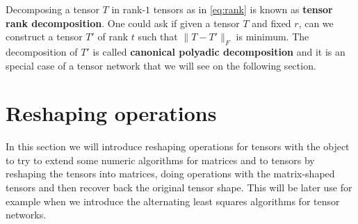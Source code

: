 \documentclass[11pt,a4paper,openright,oneside]{book}
\numberwithin{equation}{section}
\newtheorem{prop0}[defn0]{Proposition}
\newenvironment{proposition}{\bigskip \begin{prop0}}{\end{prop0}}
\newcommand{\refeq}[1]{\cref{#1}}
\DeclareMathOperator{\rank}{rank}
\begin{document}

Decomposing a tensor $T$ in rank-$1$ tensors as in \refeq{eq:rank} is known as \textbf{tensor rank decomposition}.
One could ask if given a tensor $T$ and fixed $r$, can we construct a tensor $T'$ of rank $t$ such that
$\| T - T' \|_F$ is minimum. The decomposition of $T'$ is called \textbf{canonical polyadic decomposition} and it is
an special case of a tensor network that we will see on the following section.



\section{Reshaping operations}


In this section we will introduce reshaping operations for tensors with the object to try to extend some numeric algorithms for
matrices and to tensors by reshaping the tensors into matrices, doing operations with the matrix-shaped tensors and then recover
back the original tensor shape. This will be later use for example when we introduce the alternating least squares algorithms for tensor networks.
\end{document}
